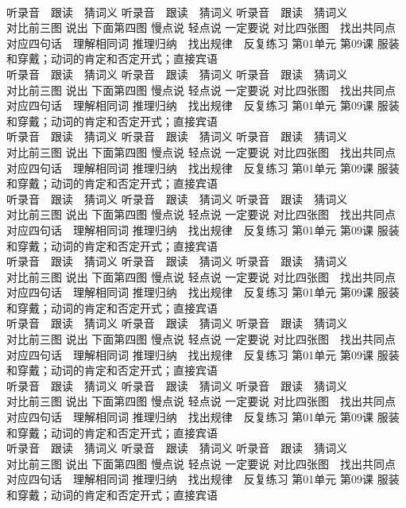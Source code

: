 \documentclass[8pt]{extreport}
\begin{document}
\begin{CJK}{UTF8}{min}
\\	听录音　跟读　猜词义 听录音　跟读　猜词义 听录音　跟读　猜词义 
\\	对比前三图 说出 下面第四图 慢点说 轻点说 一定要说	对比四张图　找出共同点 对应四句话　理解相同词 推理归纳　找出规律　反复练习 第01单元 第09课 服装和穿戴；动词的肯定和否定开式；直接宾语
\\	听录音　跟读　猜词义 听录音　跟读　猜词义 听录音　跟读　猜词义 
\\	对比前三图 说出 下面第四图 慢点说 轻点说 一定要说	对比四张图　找出共同点 对应四句话　理解相同词 推理归纳　找出规律　反复练习 第01单元 第09课 服装和穿戴；动词的肯定和否定开式；直接宾语
\\	听录音　跟读　猜词义 听录音　跟读　猜词义 听录音　跟读　猜词义 
\\	对比前三图 说出 下面第四图 慢点说 轻点说 一定要说	对比四张图　找出共同点 对应四句话　理解相同词 推理归纳　找出规律　反复练习 第01单元 第09课 服装和穿戴；动词的肯定和否定开式；直接宾语
\\	听录音　跟读　猜词义 听录音　跟读　猜词义 听录音　跟读　猜词义 
\\	对比前三图 说出 下面第四图 慢点说 轻点说 一定要说	对比四张图　找出共同点 对应四句话　理解相同词 推理归纳　找出规律　反复练习 第01单元 第09课 服装和穿戴；动词的肯定和否定开式；直接宾语
\\	听录音　跟读　猜词义 听录音　跟读　猜词义 听录音　跟读　猜词义 
\\	对比前三图 说出 下面第四图 慢点说 轻点说 一定要说	对比四张图　找出共同点 对应四句话　理解相同词 推理归纳　找出规律　反复练习 第01单元 第09课 服装和穿戴；动词的肯定和否定开式；直接宾语
\\	听录音　跟读　猜词义 听录音　跟读　猜词义 听录音　跟读　猜词义 
\\	对比前三图 说出 下面第四图 慢点说 轻点说 一定要说	对比四张图　找出共同点 对应四句话　理解相同词 推理归纳　找出规律　反复练习 第01单元 第09课 服装和穿戴；动词的肯定和否定开式；直接宾语
\\	听录音　跟读　猜词义 听录音　跟读　猜词义 听录音　跟读　猜词义 
\\	对比前三图 说出 下面第四图 慢点说 轻点说 一定要说	对比四张图　找出共同点 对应四句话　理解相同词 推理归纳　找出规律　反复练习 第01单元 第09课 服装和穿戴；动词的肯定和否定开式；直接宾语
\\	听录音　跟读　猜词义 听录音　跟读　猜词义 听录音　跟读　猜词义 
\\	对比前三图 说出 下面第四图 慢点说 轻点说 一定要说	对比四张图　找出共同点 对应四句话　理解相同词 推理归纳　找出规律　反复练习 第01单元 第09课 服装和穿戴；动词的肯定和否定开式；直接宾语

\end{CJK}
\end{document}

